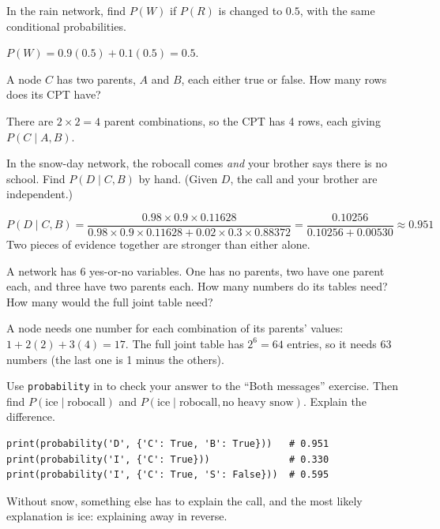 \begin{Exercise}[label=bn1, title=Compute a total probability]
In the rain network, find $P(W)$ if $P(R)$ is changed to $0.5$, with the same conditional probabilities.
\end{Exercise}
\begin{Answer}[ref=bn1]
$P(W) = 0.9(0.5) + 0.1(0.5) = 0.5$.
\end{Answer}

\begin{Exercise}[label=bn2, title=Read a table]
A node $C$ has two parents, $A$ and $B$, each either true or false. How many rows does its CPT have?
\end{Exercise}
\begin{Answer}[ref=bn2]
There are $2 \times 2 = 4$ parent combinations, so the CPT has 4 rows, each giving $P(C \mid A, B)$.
\end{Answer}

\begin{Exercise}[label=bn3, title={Both messages}, space=3cm]
In the snow-day network, the robocall comes \emph{and} your brother says there is no school. Find
$P(D \mid C, B)$ by hand. (Given $D$, the call and your brother are independent.)
\end{Exercise}
\begin{Answer}[ref=bn3]
$$P(D \mid C, B) = \frac{0.98 \times 0.9 \times 0.11628}{0.98 \times 0.9 \times 0.11628 + 0.02 \times 0.3 \times
0.88372} = \frac{0.10256}{0.10256 + 0.00530} \approx 0.951$$
Two pieces of evidence together are stronger than either alone.
\end{Answer}

\begin{Exercise}[label=bn4, title={Count the numbers}]
A network has 6 yes-or-no variables. One has no parents, two have one parent each, and three have two parents
each. How many numbers do its tables need? How many would the full joint table need?
\end{Exercise}
\begin{Answer}[ref=bn4]
A node needs one number for each combination of its parents' values: $1 + 2(2) + 3(4) = 17$. The full joint
table has $2^6 = 64$ entries, so it needs 63 numbers (the last one is 1 minus the others).
\end{Answer}

\begin{Exercise}[label=bn5, title={Check the code}]
Use \verb|probability| in  to check your answer to the ``Both messages'' exercise. Then
find $P(\text{ice} \mid \text{robocall})$ and $P(\text{ice} \mid \text{robocall}, \text{no heavy snow})$.
Explain the difference.
\end{Exercise}
\begin{Answer}[ref=bn5]
\begin{verbatim}
print(probability('D', {'C': True, 'B': True}))   # 0.951
print(probability('I', {'C': True}))              # 0.330
print(probability('I', {'C': True, 'S': False}))  # 0.595
\end{verbatim}
Without snow, something else has
to explain the call, and the most likely explanation is ice: explaining away in reverse.
\end{Answer}

